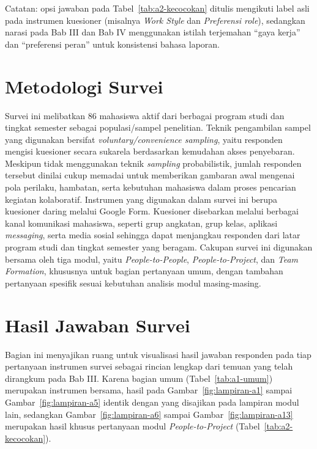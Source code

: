 Catatan: opsi jawaban pada Tabel~\ref{tab:a2-kecocokan} ditulis mengikuti label asli pada instrumen kuesioner (misalnya \emph{Work Style} dan \emph{Preferensi role}), sedangkan narasi pada Bab III dan Bab IV menggunakan istilah terjemahan ``gaya kerja'' dan ``preferensi peran'' untuk konsistensi bahasa laporan.

\section{Metodologi Survei}

Survei ini melibatkan 86 mahasiswa aktif dari berbagai program studi dan tingkat semester sebagai populasi/sampel penelitian. Teknik pengambilan sampel yang digunakan bersifat \emph{voluntary/convenience sampling}, yaitu responden mengisi kuesioner secara sukarela berdasarkan kemudahan akses penyebaran. Meskipun tidak menggunakan teknik \emph{sampling} probabilistik, jumlah responden tersebut dinilai cukup memadai untuk memberikan gambaran awal mengenai pola perilaku, hambatan, serta kebutuhan mahasiswa dalam proses pencarian kegiatan kolaboratif. Instrumen yang digunakan dalam survei ini berupa kuesioner daring melalui Google Form. Kuesioner disebarkan melalui berbagai kanal komunikasi mahasiswa, seperti grup angkatan, grup kelas, aplikasi \emph{messaging}, serta media sosial sehingga dapat menjangkau responden dari latar program studi dan tingkat semester yang beragam. Cakupan survei ini digunakan bersama oleh tiga modul, yaitu \emph{People-to-People}, \emph{People-to-Project}, dan \emph{Team Formation}, khususnya untuk bagian pertanyaan umum, dengan tambahan pertanyaan spesifik sesuai kebutuhan analisis modul masing-masing.

\section{Hasil Jawaban Survei}

Bagian ini menyajikan ruang untuk visualisasi hasil jawaban responden pada tiap pertanyaan instrumen survei sebagai rincian lengkap dari temuan yang telah dirangkum pada Bab III. Karena bagian umum (Tabel~\ref{tab:a1-umum}) merupakan instrumen bersama, hasil pada Gambar~\ref{fig:lampiran-a1} sampai Gambar~\ref{fig:lampiran-a5} identik dengan yang disajikan pada lampiran modul lain, sedangkan Gambar~\ref{fig:lampiran-a6} sampai Gambar~\ref{fig:lampiran-a13} merupakan hasil khusus pertanyaan modul \emph{People-to-Project} (Tabel~\ref{tab:a2-kecocokan}).

